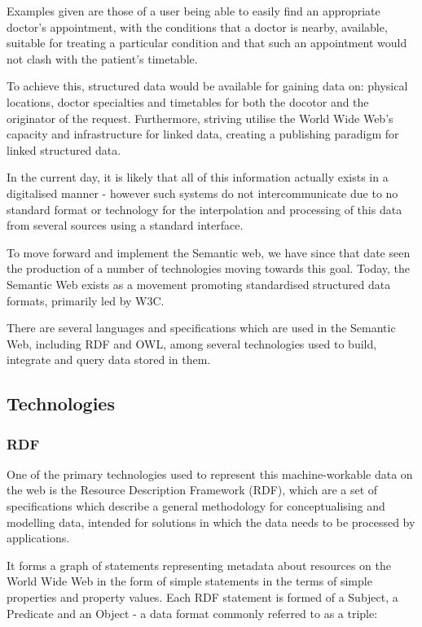 \documentclass{article}
\begin{document}
Examples given are those of a user being able to easily find an appropriate
doctor's appointment, with the conditions that a doctor is nearby, available, 
suitable for treating a particular condition and that such an appointment would
not clash with the patient's timetable.

To achieve this, structured data would be available for gaining data on:
physical locations, doctor specialties and timetables for both the docotor and
the originator of the request. Furthermore, striving utilise the World Wide 
Web's capacity and infrastructure for linked data, creating a publishing
paradigm for linked structured data\cite{linkdata}.

In the current day, it is likely that all of this information actually exists in
a digitalised manner - however such systems do not intercommunicate due to no
standard format or technology for the interpolation and processing of this data
from several sources using a standard interface. 

To move forward and implement the Semantic web, we have since that date seen the
production of a number of technologies moving towards this goal. Today, the
Semantic Web exists as a movement promoting standardised structured data
formats, primarily led by W3C.\cite{revisited}

There are several languages and specifications which are used in the Semantic
Web, including RDF and OWL, among several technologies used to build, integrate
and query data stored in them.

\subsection{Technologies}

\subsubsection{RDF}

One of the primary technologies used to represent this machine-workable data on
the web is the Resource Description Framework (RDF)\cite{rdf}, which are a set of
specifications which describe a general methodology for conceptualising and
modelling data, intended for solutions in which the data needs to be processed
by applications.

It forms a graph of statements representing metadata about resources on the
World Wide Web in the form of simple statements in the terms of simple
properties and property values. Each RDF statement is formed of a Subject, a
Predicate and an Object - a data format commonly referred to as a triple:
\end{document}

